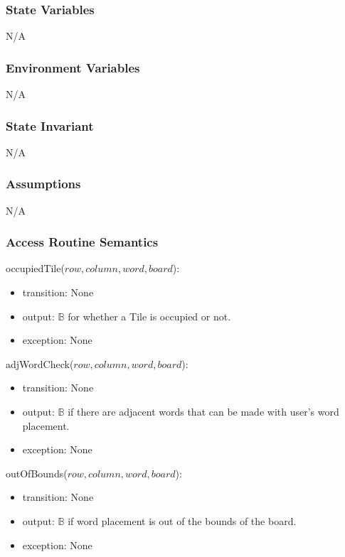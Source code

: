 \documentclass[12pt]{article}
\begin{document}
\subsubsection*{State Variables}

N/A

\subsubsection*{Environment Variables}

N/A

\subsubsection*{State Invariant}

N/A

\subsubsection*{Assumptions}

N/A

\subsubsection* {Access Routine Semantics}

\noindent occupiedTile($row, column, word, board$):
\begin{itemize}
\item transition: None
\item output: $\mathbb{B}$ for whether a Tile is occupied or not.
\item exception: None
\end{itemize}

\noindent adjWordCheck($row, column, word, board$):
\begin{itemize}
\item transition: None
\item output: $\mathbb{B}$ if there are adjacent words that can be made with user's word placement.
\item exception: None
\end{itemize}

\noindent outOfBounds($row, column, word, board$):
\begin{itemize}
\item transition: None
\item output: $\mathbb{B}$ if word placement is out of the bounds of the board.
\item exception: None
\end{itemize}
\end{document}
